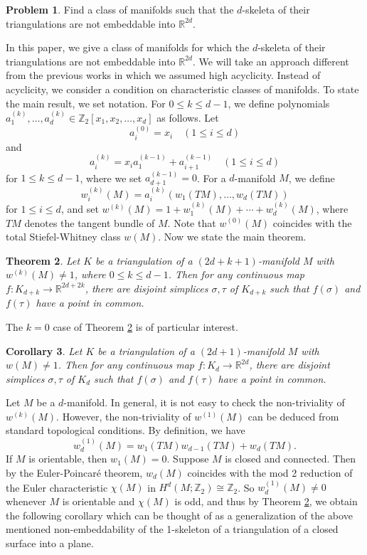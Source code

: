 \documentclass[amsfonts]{amsart}
\numberwithin{equation}{section}
\newtheorem{theorem}{Theorem}[section]
\newtheorem{corollary}[theorem]{Corollary}
\theoremstyle{definition}
\newtheorem{problem}[theorem]{Problem}
\theoremstyle{remark}
\newcommand{\Z}{\mathbb{Z}}
\newcommand{\R}{\mathbb{R}}
\begin{document}
  \begin{problem}
    Find a class of manifolds such that the $d$-skeleta of their triangulations are not embeddable into $\R^{2d}$.
  \end{problem}



  In this paper, we give a class of manifolds for which the $d$-skeleta of their triangulations are not embeddable into $\R^{2d}$. We will take an approach different from the previous works \cite{HKTT,KM} in which we assumed high acyclicity. Instead of acyclicity, we consider a condition on characteristic classes of manifolds. To state the main result, we set notation. For $0\le k\le d-1$, we define polynomials $a_1^{(k)},\ldots,a_d^{(k)}\in\Z_2[x_1,x_2,\ldots,x_d]$ as follows. Let
  \[
    a_i^{(0)}=x_i\quad(1\le i\le d)
  \]
  and
  \[
    a_i^{(k)}=x_ia_1^{(k-1)}+a_{i+1}^{(k-1)}\quad(1\le i\le d)
  \]
  for $1\le k\le d-1$, where we set $a_{d+1}^{(k-1)}=0$. For a $d$-manifold $M$, we define
  \[
    w^{(k)}_i(M)=a_i^{(k)}(w_1(TM),\ldots,w_d(TM))
  \]
  for $1\le i\le d$, and set $w^{(k)}(M)=1+w_1^{(k)}(M)+\cdots+w_d^{(k)}(M)$, where $TM$ denotes the tangent bundle of $M$. Note that $w^{(0)}(M)$ coincides with the total Stiefel-Whitney class $w(M)$. Now we state the main theorem.



  \begin{theorem}
    \label{main}
    Let $K$ be a triangulation of a $(2d+k+1)$-manifold $M$ with $w^{(k)}(M)\ne 1$, where $0\le k\le d-1$. Then for any continuous map $f\colon K_{d+k}\to\R^{2d+2k}$, there are disjoint simplices $\sigma,\tau$ of $K_{d+k}$ such that $f(\sigma)$ and $f(\tau)$ have a point in common.
  \end{theorem}



  The $k=0$ case of Theorem \ref{main} is of particular interest.



  \begin{corollary}
    \label{k=0}
    Let $K$ be a triangulation of a $(2d+1)$-manifold $M$ with $w(M)\ne 1$. Then for any continuous map $f\colon K_d\to\R^{2d}$, there are disjoint simplices $\sigma,\tau$ of $K_d$ such that $f(\sigma)$ and $f(\tau)$ have a point in common.
  \end{corollary}



  Let $M$ be a $d$-manifold. In general, it is not easy to check the non-triviality of $w^{(k)}(M)$. However, the non-triviality of $w^{(1)}(M)$ can be deduced from standard topological conditions. By definition, we have
  \[
    w_d^{(1)}(M)=w_1(TM)w_{d-1}(TM)+w_d(TM).
  \]
  If $M$ is orientable, then $w_1(M)=0$. Suppose $M$ is closed and connected. Then by the Euler-Poincar\'e theorem, $w_d(M)$ coincides with the mod 2 reduction of the Euler characteristic $\chi(M)$ in $H^d(M;\Z_2)\cong\Z_2$. So $w_d^{(1)}(M)\ne 0$ whenever $M$ is orientable and $\chi(M)$ is odd, and thus by Theorem \ref{main}, we obtain the following corollary which can be thought of as a generalization of the above mentioned non-embeddability of the 1-skeleton of a triangulation of a closed surface into a plane.
\end{document}
